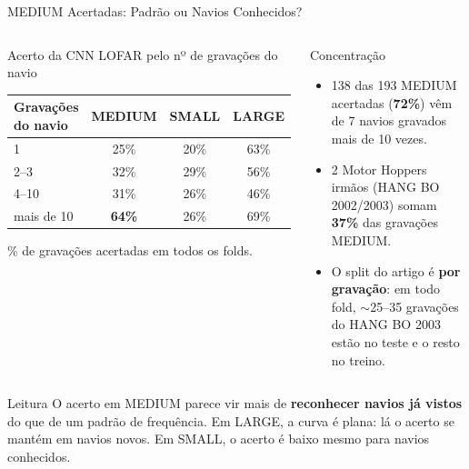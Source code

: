 \documentclass[aspectratio=169]{beamer}
\newcommand{\cahi}[1]{\cellcolor{green!30}\textbf{#1}}
\newcommand{\calo}[1]{\cellcolor{red!20}#1}
\begin{document}
\begin{frame}{MEDIUM Acertadas: Padrão ou Navios Conhecidos?}
    \footnotesize
    \begin{columns}[t]
        \begin{block}{\small Acerto da CNN LOFAR pelo nº de gravações do navio}
            \scriptsize
            \centering
            \begin{tabular}{lccc}
            \toprule
            Gravações do navio & MEDIUM & SMALL & LARGE \\
            \midrule
            1 & \calo{25\%} & 20\% & 63\% \\
            2--3 & 32\% & 29\% & 56\% \\
            4--10 & 31\% & 26\% & 46\% \\
            mais de 10 & \cahi{64\%} & 26\% & 69\% \\
            \bottomrule
            \end{tabular}

            \vspace{0.05cm}
            {\tiny \% de gravações acertadas em todos os folds.\par}
        \end{block}
        \begin{block}{\small Concentração}
            \scriptsize
            \begin{itemize}
                \setlength{\itemsep}{1pt}
                \item 138 das 193 MEDIUM acertadas (\textbf{72\%}) vêm de 7 navios gravados mais de 10 vezes.
                \item 2 Motor Hoppers irmãos (HANG BO 2002/2003) somam \textbf{37\%} das gravações MEDIUM.
                \item O split do artigo é \textbf{por gravação}: em todo fold, $\sim$25--35 gravações do HANG BO 2003 estão no teste e o resto no treino.
            \end{itemize}
        \end{block}
    \end{columns}
    \vspace{0.1cm}
    \begin{alertblock}{Leitura}
        \scriptsize
        O acerto em MEDIUM parece vir mais de \textbf{reconhecer navios já vistos} do que de um padrão de frequência. Em LARGE, a curva é plana: lá o acerto se mantém em navios novos. Em SMALL, o acerto é baixo mesmo para navios conhecidos.
    \end{alertblock}
\end{frame}
\end{document}
